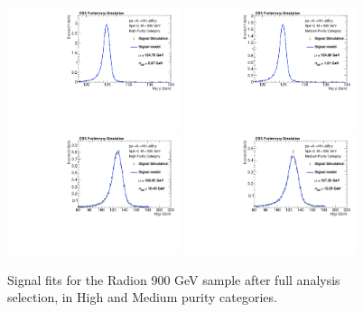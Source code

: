 \begin{figure}[thb]
  \centering
  \includegraphics[width=0.45\textwidth]{figures/sec-signals/Rad900_signal_fit_mgg_cat0}\hfil
  \includegraphics[width=0.45\textwidth]{figures/sec-signals/Rad900_signal_fit_mgg_cat1}\hfil
  \includegraphics[width=0.45\textwidth]{figures/sec-signals/Rad900_signal_fit_mjj_cat0}\hfil
  \includegraphics[width=0.45\textwidth]{figures/sec-signals/Rad900_signal_fit_mjj_cat1}\hfil
  \caption{Signal fits for the Radion 900 GeV sample after full analysis selection, in High and Medium purity categories.}
  \label{fig:rad900}
\end{figure}


